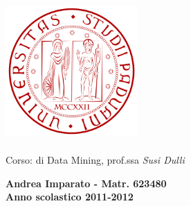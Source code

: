 
\begin{titlepage} %

\begin{center}


         \includegraphics[height=5cm]{logo_unipd.png}\\[1cm]
            \Huge \textbf{\the\titolo}\\
            \vspace{4cm}
                	\Large{Corso: di Data Mining, prof.ssa \emph{Susi Dulli}}
            \vspace{4cm}
            

        \normalsize \textbf{Andrea Imparato - Matr. 623480}\\[1cm] %
        \normalsize \textbf{Anno scolastico 2011-2012} %




\end{center}
\end{titlepage}

